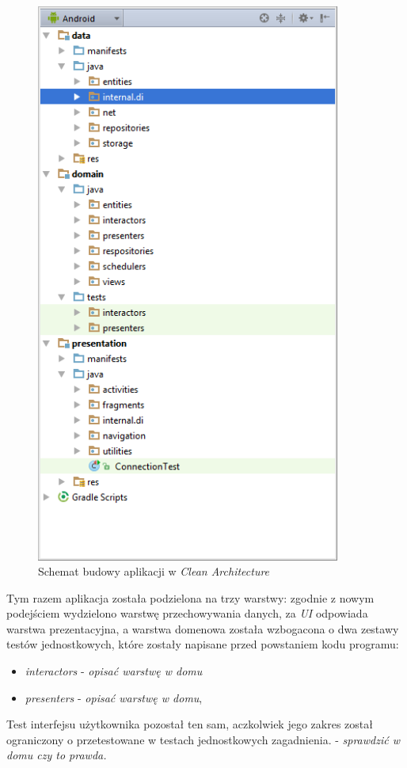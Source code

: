 \begin{figure}[!htb]
    \centering
    \includegraphics[width=10cm]{imgs/ch6_app_cl.png}
    \caption
{Schemat budowy aplikacji w \textit{Clean Architecture}}
    \label{fig:app_std}
\end{figure} 

Tym razem aplikacja została podzielona na trzy warstwy: zgodnie z nowym podejściem wydzielono warstwę przechowywania danych, za \textit{UI} odpowiada warstwa prezentacyjna, a warstwa domenowa została wzbogacona o dwa zestawy testów jednostkowych, które zostały napisane przed powstaniem kodu programu:
\begin{itemize}
\item
\textit{interactors} - \textit{opisać warstwę w domu}
\item
\textit{presenters} - \textit{opisać warstwę w domu},
\end{itemize}
Test interfejsu użytkownika pozostał ten sam, aczkolwiek jego zakres został ograniczony o przetestowane w testach jednostkowych zagadnienia. - \textit{sprawdzić w domu czy to prawda.}

